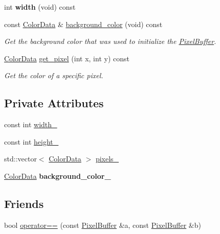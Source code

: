 \begin{DoxyCompactItemize}
\item 
int {\bfseries width} (void) const \hypertarget{classimage__tools_1_1PixelBuffer_a6143b06b081402013a5f346222b2ab5f}{}\label{classimage__tools_1_1PixelBuffer_a6143b06b081402013a5f346222b2ab5f}

\item 
const \hyperlink{classimage__tools_1_1ColorData}{Color\+Data} \& \hyperlink{classimage__tools_1_1PixelBuffer_a56ac2b6b21368d04a71d6a615eebdd33}{background\+\_\+color} (void) const 
\begin{DoxyCompactList}\small\item\em Get the background color that was used to initialize the \hyperlink{classimage__tools_1_1PixelBuffer}{Pixel\+Buffer}. \end{DoxyCompactList}\item 
\hyperlink{classimage__tools_1_1ColorData}{Color\+Data} \hyperlink{classimage__tools_1_1PixelBuffer_af1a9e6d73a1a1fde15e4dbeff335c376}{get\+\_\+pixel} (int x, int y) const 
\begin{DoxyCompactList}\small\item\em Get the color of a specific pixel. \end{DoxyCompactList}\end{DoxyCompactItemize}
\subsection*{Private Attributes}
\begin{DoxyCompactItemize}
\item 
const int \hyperlink{classimage__tools_1_1PixelBuffer_ac67206a6b428c7b33bd7f90f65b8c171}{width\+\_\+}
\item 
const int \hyperlink{classimage__tools_1_1PixelBuffer_ae104466eae109324a4a0daa0bc14c980}{height\+\_\+}
\item 
std\+::vector$<$ \hyperlink{classimage__tools_1_1ColorData}{Color\+Data} $>$ \hyperlink{classimage__tools_1_1PixelBuffer_a0c52483e7e29f111acf98474105f2409}{pixels\+\_\+}
\item 
\hyperlink{classimage__tools_1_1ColorData}{Color\+Data} {\bfseries background\+\_\+color\+\_\+}\hypertarget{classimage__tools_1_1PixelBuffer_a67c70e090217b58856633ff35d499de2}{}\label{classimage__tools_1_1PixelBuffer_a67c70e090217b58856633ff35d499de2}

\end{DoxyCompactItemize}
\subsection*{Friends}
\begin{DoxyCompactItemize}
\item 
bool \hyperlink{classimage__tools_1_1PixelBuffer_a68aef4100a6c7062d102b566dc382543}{operator==} (const \hyperlink{classimage__tools_1_1PixelBuffer}{Pixel\+Buffer} \&a, const \hyperlink{classimage__tools_1_1PixelBuffer}{Pixel\+Buffer} \&b)
\end{DoxyCompactItemize}


